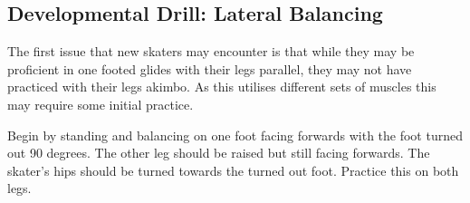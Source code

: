 \subsection*{Developmental Drill: Lateral Balancing}
\label{drill:laterals/developmental_balancing}

The first issue that new skaters may encounter is that while they may be proficient in one footed glides with their legs parallel, they may not have practiced with their legs akimbo.     
As this utilises different sets of muscles this may require some initial practice.


Begin by standing and balancing on one foot facing forwards with the foot turned out 90 degrees.
The other leg should be raised but still facing forwards. 
The skater's hips should be turned towards the turned out foot. 
Practice this on both legs.
